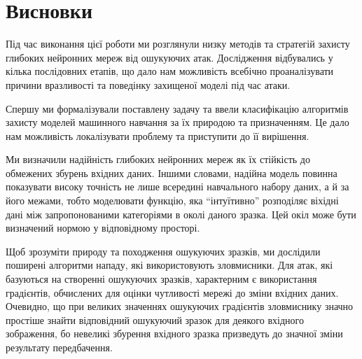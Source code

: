\documentclass[14pt,a4paper]{extarticle}
\newcounter{e}
\numberwithin{equation}{section}
\numberwithin{figure}{section}
\begin{document}

 
 
 \newpage
 \thispagestyle{empty}
 \section*{Висновки}
 
 Під час виконання цієї роботи ми розглянули низку методів та стратегій захисту глибоких нейронних мереж від ошукуючих атак. Дослідження відбувались у кілька послідовних етапів, що дало нам можливість всебічно проаналізувати причини вразливості та поведінку захищеної моделі під час атаки. 
 
 Спершу ми формалізували поставлену задачу та ввели класифікацію алгоритмів захисту моделей машинного навчання за їх природою та призначенням. Це дало нам можливість локалізувати проблему та приступити до її вирішення. 
 
 Ми визначили надійність глибоких нейронних мереж як їх стійкість до обмежених збурень вхідних даних. Іншими словами, надійна модель повинна показувати високу точність не лише всередині навчального набору даних, а й за його межами, тобто моделювати функцію, яка ``інтуїтивно'' розподіляє віхідні дані між запропонованими категоріями в околі даного зразка. Цей окіл може бути визначений нормою у відповідному просторі.
 
 Щоб зрозуміти природу та походження ошукуючих зразків, ми дослідили поширені алгоритми нападу, які використовують зловмисники.
 Для атак, які базуються на створенні ошукуючих зразків, характерним є використання градієнтів, обчислених для оцінки чутливості мережі до зміни вхідних даних. Очевидно, що при великих значеннях ошукуючих градієнтів зловмиснику значно простіше знайти відповідний ошукуючий зразок для деякого вхідного зображення, бо невеликі збурення вхідного зразка призведуть до значної зміни результату передбачення.
 
\end{document}
